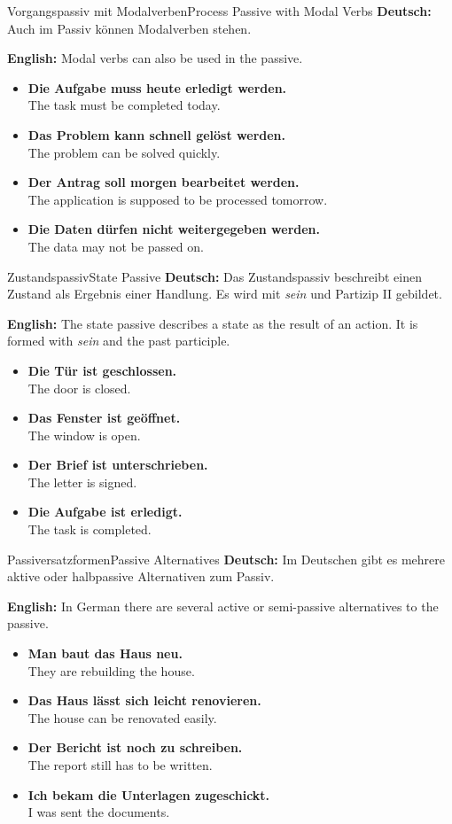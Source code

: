 \documentclass[a4paper,11pt]{article}
\newcommand{\GermanText}[1]{\textbf{Deutsch: }#1\par}
\newcommand{\EnglishText}[1]{{\color{SoftGray}\textbf{English: }#1\par}}
\newcommand{\ExampleItem}[2]{\item \textbf{#1}\\{\color{SoftGray}#2}}
\begin{document}
\begin{grammarentry}{Vorgangspassiv mit Modalverben}{Process Passive with Modal Verbs}
    \GermanText{Auch im Passiv können Modalverben stehen.}
    \EnglishText{Modal verbs can also be used in the passive.}
    \begin{exbox}
        \begin{itemize}
            \ExampleItem{Die Aufgabe muss heute erledigt werden.}{The task must be completed today.}
            \ExampleItem{Das Problem kann schnell gelöst werden.}{The problem can be solved quickly.}
            \ExampleItem{Der Antrag soll morgen bearbeitet werden.}{The application is supposed to be processed tomorrow.}
            \ExampleItem{Die Daten dürfen nicht weitergegeben werden.}{The data may not be passed on.}
        \end{itemize}
    \end{exbox}
\end{grammarentry}

\begin{grammarentry}{Zustandspassiv}{State Passive}
    \GermanText{Das Zustandspassiv beschreibt einen Zustand als Ergebnis einer Handlung. Es wird mit \textit{sein} und Partizip II gebildet.}
    \EnglishText{The state passive describes a state as the result of an action. It is formed with \textit{sein} and the past participle.}
    \begin{exbox}
        \begin{itemize}
            \ExampleItem{Die Tür ist geschlossen.}{The door is closed.}
            \ExampleItem{Das Fenster ist geöffnet.}{The window is open.}
            \ExampleItem{Der Brief ist unterschrieben.}{The letter is signed.}
            \ExampleItem{Die Aufgabe ist erledigt.}{The task is completed.}
        \end{itemize}
    \end{exbox}
\end{grammarentry}

\begin{grammarentry}{Passiversatzformen}{Passive Alternatives}
    \GermanText{Im Deutschen gibt es mehrere aktive oder halbpassive Alternativen zum Passiv.}
    \EnglishText{In German there are several active or semi-passive alternatives to the passive.}
    \begin{exbox}
        \begin{itemize}
            \ExampleItem{Man baut das Haus neu.}{They are rebuilding the house.}
            \ExampleItem{Das Haus lässt sich leicht renovieren.}{The house can be renovated easily.}
            \ExampleItem{Der Bericht ist noch zu schreiben.}{The report still has to be written.}
            \ExampleItem{Ich bekam die Unterlagen zugeschickt.}{I was sent the documents.}
        \end{itemize}
    \end{exbox}
\end{grammarentry}
\end{document}
